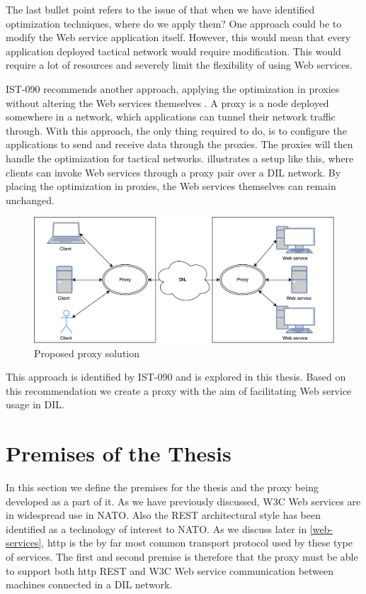 The last bullet point refers to the issue of that when we have identified
optimization techniques, where do we apply them? One approach could be to modify
the Web service application itself. However, this would mean that every
application deployed tactical network would require modification. This would
require a lot of resources and severely limit the flexibility of using Web
services.

IST-090 recommends another approach, applying the optimization in proxies
without altering the Web services themselves \cite{ist-090}. A proxy is a node
deployed somewhere in a network, which applications can tunnel their network
traffic through. With this approach, the only thing required to do, is to
configure the applications to send and receive data through the proxies. The
proxies will then handle the optimization for tactical networks.
 illustrates a setup like this, where
clients can invoke Web services through a proxy pair over a DIL network. By
placing the optimization in proxies, the Web services themselves can remain
unchanged.

\begin{figure}[h] \includegraphics[scale=0.5]{images/proposed_solution.pdf}
\caption{Proposed proxy solution} \label{figure-proposed-proxy-solution}
\end{figure}

This approach is identified by IST-090 and is explored in this thesis. Based on
this recommendation we create a proxy with the aim of facilitating Web service
usage in DIL.


\section{Premises of the Thesis}

In this section we define the premises for the thesis and the proxy being
developed as a part of it. As we have previously discussed, W3C Web services are
in widespread use in NATO. Also the REST architectural style has been identified
as a technology of interest to NATO. As we discuss later in \cref{web-services},
\gls{http} is the by far most common transport protocol used by these type of
services. The first and second premise is therefore that the proxy must be able
to support both \gls{http} REST and W3C Web service communication between
machines connected in a DIL network.

